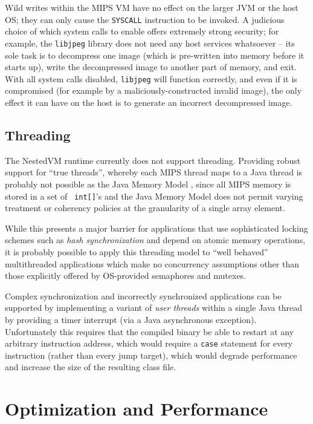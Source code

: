 \documentclass{acmconf}
\begin{document}
Wild writes within the MIPS VM have no effect on the larger JVM or the
host OS; they can only cause the {\tt SYSCALL} instruction to be
invoked.  A judicious choice of which system calls to enable offers
extremely strong security; for example, the {\tt libjpeg} library does
not need any host services whatsoever -- its sole task is to
decompress one image (which is pre-written into memory before it
starts up), write the decompressed image to another part of memory,
and exit.  With all system calls disabled, {\tt libjpeg} will function
correctly, and even if it is compromised (for example by a
maliciously-constructed invalid image), the only effect it can have on
the host is to generate an incorrect decompressed image.


\subsection{Threading}

The NestedVM runtime currently does not support threading.  Providing
robust support for ``true threads'', whereby each MIPS thread maps to
a Java thread is probably not possible as the Java Memory Model
\cite{jmm}, since all MIPS memory is stored in a set of {\tt
int[]}'s and the Java Memory Model does not permit varying treatment
or coherency policies at the granularity of a single array element.

While this presents a major barrier for applications that use
sophisticated locking schemes such as {\it hash synchronization} and
depend on atomic memory operations, it is probably possible to apply
this threading model to ``well behaved'' multithreaded applications
which make no concurrency assumptions other than those explicitly
offered by OS-provided semaphores and mutexes.

Complex synchronization and incorrectly synchronized applications can
be supported by implementing a variant of {\it user threads} within a
single Java thread by providing a timer interrupt (via a Java
asynchronous exception).  Unfortunately this requires that the
compiled binary be able to restart at any arbitrary instruction
address, which would require a {\tt case} statement for every
instruction (rather than every jump target), which would degrade
performance and increase the size of the resulting class file.

\section{Optimization and Performance}
\end{document}
